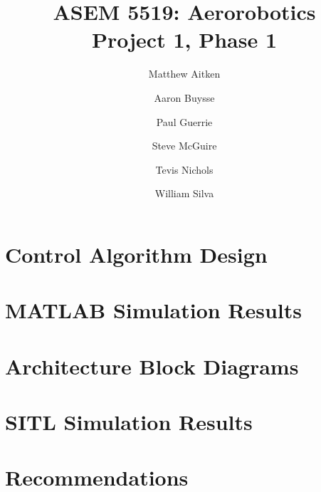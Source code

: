\documentclass{aiaa}
\title{ASEM 5519: Aerorobotics \\ Project 1, Phase 1}
\author{Matthew Aitken \and Aaron Buysse \and Paul Guerrie \and Steve McGuire
\and Tevis Nichols \and William Silva}
\begin{document}
\maketitle
\section{Control Algorithm Design}
\section{MATLAB Simulation Results}
\section{Architecture Block Diagrams}
\section{SITL Simulation Results}
\section{Recommendations}
\end{document}

